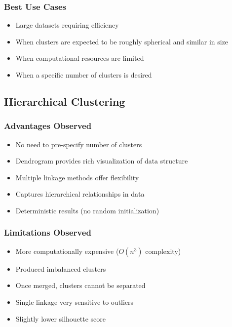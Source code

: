 \documentclass[12pt,a4paper]{article}
\begin{document}
\subsubsection{Best Use Cases}
\begin{itemize}
    \item Large datasets requiring efficiency
    \item When clusters are expected to be roughly spherical and similar in size
    \item When computational resources are limited
    \item When a specific number of clusters is desired
\end{itemize}

\subsection{Hierarchical Clustering}

\subsubsection{Advantages Observed}
\begin{itemize}
    \item[$\checkmark$] No need to pre-specify number of clusters
    \item[$\checkmark$] Dendrogram provides rich visualization of data structure
    \item[$\checkmark$] Multiple linkage methods offer flexibility
    \item[$\checkmark$] Captures hierarchical relationships in data
    \item[$\checkmark$] Deterministic results (no random initialization)
\end{itemize}

\subsubsection{Limitations Observed}
\begin{itemize}
    \item[$\times$] More computationally expensive ($O(n^3)$ complexity)
    \item[$\times$] Produced imbalanced clusters
    \item[$\times$] Once merged, clusters cannot be separated
    \item[$\times$] Single linkage very sensitive to outliers
    \item[$\times$] Slightly lower silhouette score
\end{itemize}
\end{document}
